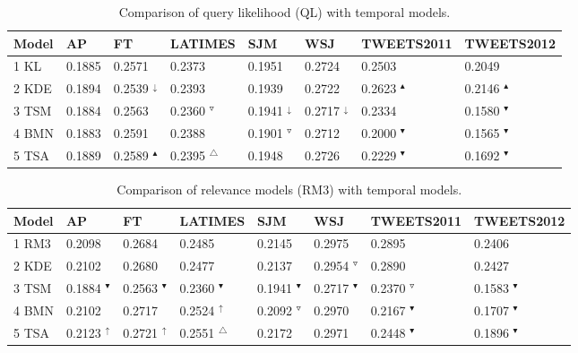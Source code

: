\documentclass{sig-alternate}
\begin{document}
\begin{table*}[t]
\small
\caption{Comparison of query likelihood (QL) with temporal models. }
\begin{center}
\tabcolsep=0.11cm
\begin{tabular}{l | l | l | l | l | l | l | l}
\hline
\bf{Model}& \bf{AP} & \bf{FT} & \bf{LATIMES} & \bf{SJM} & \bf{WSJ} & \bf{TWEETS2011} & \bf{TWEETS2012} \\ \hline 
1 KL & 0.1885  & 0.2571  & 0.2373  & 0.1951  & 0.2724  & 0.2503  & 0.2049 \\ \hline 
2 KDE & 0.1894  & 0.2539 $^{\downarrow}$  & 0.2393  & 0.1939  & 0.2722  & 0.2623 $^{\blacktriangle}$  & 0.2146 $^{\blacktriangle}$ \\ \hline 
3 TSM & 0.1884  & 0.2563  & 0.2360 $^{\triangledown}$  & 0.1941 $^{\downarrow}$  & 0.2717 $^{\downarrow}$  & 0.2334  & 0.1580 $^{\blacktriangledown}$ \\ \hline 
4 BMN & 0.1883  & 0.2591  & 0.2388  & 0.1901 $^{\triangledown}$  & 0.2712  & 0.2000 $^{\blacktriangledown}$  & 0.1565 $^{\blacktriangledown}$ \\ \hline 
5 TSA & 0.1889  & 0.2589 $^{\blacktriangle}$  & 0.2395 $^{\triangle}$  & 0.1948  & 0.2726  & 0.2229 $^{\blacktriangledown}$  & 0.1692 $^{\blacktriangledown}$ \\ \hline 
\end{tabular}
\end{center}
\label{table.results}
\normalsize
\end{table*}
\begin{table*}[t]
\small
\caption{Comparison of relevance models (RM3) with temporal models. }
\begin{center}
\tabcolsep=0.11cm
\begin{tabular}{l | l | l | l | l | l | l | l}
\hline
\bf{Model}& \bf{AP} & \bf{FT} & \bf{LATIMES} & \bf{SJM} & \bf{WSJ} & \bf{TWEETS2011} & \bf{TWEETS2012} \\ \hline 
1 RM3 & 0.2098  & 0.2684  & 0.2485  & 0.2145  & 0.2975  & 0.2895  & 0.2406 \\ \hline 
2 KDE & 0.2102  & 0.2680  & 0.2477  & 0.2137  & 0.2954 $^{\triangledown}$  & 0.2890  & 0.2427 \\ \hline 
3 TSM & 0.1884 $^{\blacktriangledown}$  & 0.2563 $^{\blacktriangledown}$  & 0.2360 $^{\blacktriangledown}$  & 0.1941 $^{\blacktriangledown}$  & 0.2717 $^{\blacktriangledown}$  & 0.2370 $^{\triangledown}$  & 0.1583 $^{\blacktriangledown}$ \\ \hline 
4 BMN & 0.2102  & 0.2717  & 0.2524 $^{\uparrow}$  & 0.2092 $^{\triangledown}$  & 0.2970  & 0.2167 $^{\blacktriangledown}$  & 0.1707 $^{\blacktriangledown}$ \\ \hline 
5 TSA & 0.2123 $^{\uparrow}$  & 0.2721 $^{\uparrow}$  & 0.2551 $^{\triangle}$  & 0.2172  & 0.2971  & 0.2448 $^{\blacktriangledown}$  & 0.1896 $^{\blacktriangledown}$ \\ \hline 
\end{tabular}
\end{center}
\label{table.results}
\normalsize
\end{table*}
\end{document}
